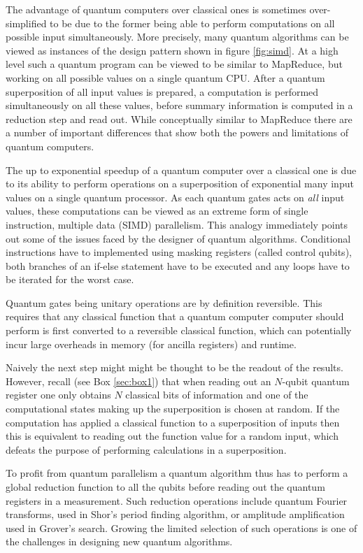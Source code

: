 \documentclass[journal]{IEEEtran}
\begin{document}
The advantage of quantum computers over classical ones is sometimes over-simplified to be due to the former being able to perform computations on all possible input simultaneously. More precisely, many quantum algorithms can be viewed as instances of the design pattern shown in figure \ref{fig:simd}. At a high level such a quantum program can be viewed to be similar to MapReduce, but working on all possible values on a single quantum CPU. After a quantum superposition of all input values is prepared, a computation is performed simultaneously on all these values, before summary information is computed in a reduction step and read out. 
While conceptually similar to MapReduce there are a number of important differences that show both the powers and limitations of quantum computers.

The up to exponential speedup of a quantum computer over a classical one is due to its ability to perform operations on a superposition of exponential many input values on a single quantum processor. As each quantum gates acts on {\em all} input values, these computations can be viewed as an extreme form of single instruction, multiple data (SIMD) parallelism. This analogy immediately points out some of the issues faced by the designer of quantum algorithms. Conditional instructions have to implemented using masking registers (called control qubits), both branches of an if-else statement have to be executed and any loops have to be iterated for the worst case.

Quantum gates being unitary operations are by definition reversible. This requires that any classical function that a quantum computer computer should perform is first converted to a reversible classical function, which can potentially incur large overheads in memory (for ancilla registers) and runtime.

Naively the next step might might be thought to be the readout of the results. However, recall (see Box \ref{sec:box1}) that when reading out an $N$-qubit quantum register one only obtains $N$ classical bits of information and one of the computational states making up the superposition is chosen at random. If the computation has applied a classical function to a superposition of inputs then this is  equivalent to reading out the function value for a random input, which defeats the purpose of performing calculations in a superposition. 

To profit from quantum parallelism a quantum algorithm thus has to perform a global reduction function to all the qubits before reading out the quantum registers in a measurement. Such reduction operations include quantum Fourier transforms, used in Shor's period finding algorithm, or amplitude amplification used in Grover's search. Growing the limited selection of such operations is one of the challenges in designing new quantum algorithms.
\end{document}
